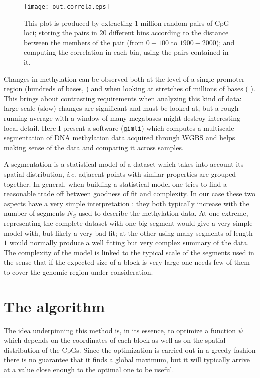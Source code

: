 \documentclass[12pt]{amsart}
\newcommand{\gimli}{\texttt{gimli}}
\newcommand{\ie}{\textit{i.e.}}
\begin{document}
\begin{center}
\begin{figure}\label{fig_corr}
\texttt{[image: out.correla.eps]}
\caption{This plot is produced by extracting $1$ million random pairs of CpG loci;
storing the pairs in $20$ different bins  according to the distance between the members
of the pair (from $0-100$ to $1900-2000$); and computing the correlation in each bin,
using the pairs contained in it.}
\end{figure}
\end{center}
 
Changes in methylation can be observed both at the level of a single promoter
region (hundreds of bases, \cite{methylseekr}) and when looking at stretches
of millions of bases (\cite{largeblocks} ).
This brings about contrasting requirements when analyzing this kind of data: large scale (slow) changes are 
significant and must be looked at, but a rough
running average with a window of many megabases might destroy interesting
local detail. Here I present  a software (\gimli{}) which computes a multiscale segmentation 
of DNA methylation 
data acquired through WGBS and helps making sense of the data and comparing
it across samples.

A segmentation is a statistical model of a dataset  which takes into account its spatial distribution,
\ie{} adjacent points with similar properties are grouped together.
In general, when building a statistical model one tries to find a reasonable 
trade off between goodness of fit and complexity.
In our case these two aspects have a very simple interpretation : they both typically 
increase with the number of segments $N_S$ used to describe the 
methylation data.  
At one extreme, representing the complete dataset with one big segment would 
give a very simple model with, but likely a very bad fit;  
at the other using many segments of length $1$ would normally produce
a well fitting but very complex summary of the data.
The complexity of the model is linked to the typical scale of the segments used
in the sense that if the expected size of a block is very large one needs few of them to 
cover the genomic region under consideration.

\section{The algorithm}
The idea underpinning this method is, in its essence, to optimize  
a function $\psi$ which depends on the coordinates
of each block as well as on the spatial distribution of the CpGs.
Since the optimization is carried out
in a greedy fashion there is no guarantee
that it finds a global maximum, 
but it will typically arrive at a value close enough to the optimal 
one to be useful.
\end{document}
